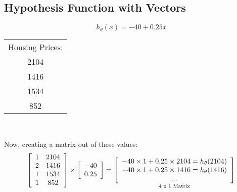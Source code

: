\documentclass{article}
\begin{document}
\subsection{Hypothesis Function with Vectors}
\[
    h_{\theta}(x) = -40 + 0.25x
\]
\begin{center}
    \begin{tabular}{ |c| }
        \hline
        Housing Prices:\\
        2104\\
        1416\\
        1534\\
        852\\
        \hline
    \end{tabular}\\
\end{center}
Now, creating a matrix out of these values:
\[
\left[\begin{array}[]{cc}
    1 & 2104\\
    2 & 1416\\
    1 & 1534\\
    1 & 852
\end{array}\right]
\times
\left[\begin{array}[]{c}
    -40\\
    0.25
\end{array}\right]
=
\underset{\text{4 x 1 Matrix}}{
    \left[\begin{array}[]{c}
        -40\times1+0.25\times2104 = h_{\theta}(2104)\\
        -40\times1+0.25\times1416 = h_{\theta}(1416)\\
        ...
    \end{array}\right]
}
\]
\end{document}

